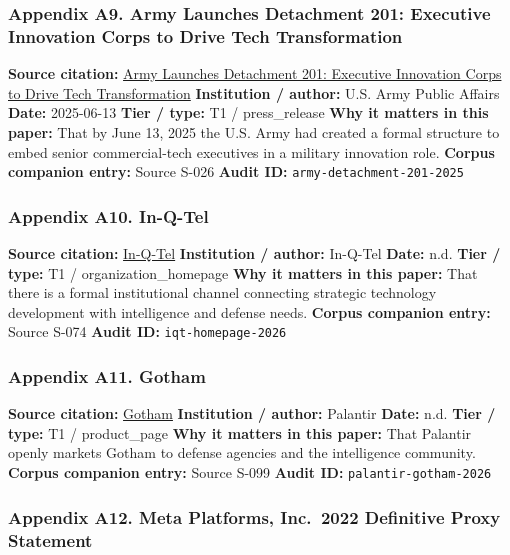 \documentclass[
  american,
  11pt,
  letterpaper,
]{article}
\begin{document}
\subsubsection{Appendix A9. Army Launches Detachment 201: Executive
Innovation Corps to Drive Tech
Transformation}\label{ch-07-appendix-a9-army-launches-detachment-201-executive-innovation-corps-to-drive-tech-transformation}

\textbf{Source citation:}
\href{https://www.army.mil/article/286317/army_launches_detachment_201_executive_innovation_corps_to_drive_tech_transformation}{Army
Launches Detachment 201: Executive Innovation Corps to Drive Tech
Transformation} \textbf{Institution / author:} U.S. Army Public Affairs
\textbf{Date:} 2025-06-13 \textbf{Tier / type:} T1 / press\_release
\textbf{Why it matters in this paper:} That by June 13, 2025 the U.S.
Army had created a formal structure to embed senior commercial-tech
executives in a military innovation role. \textbf{Corpus companion
entry:} Source S-026 \textbf{Audit ID:}
\texttt{army-detachment-201-2025}

\subsubsection{Appendix A10.
In-Q-Tel}\label{ch-07-appendix-a10-in-q-tel}

\textbf{Source citation:} \href{https://www.iqt.org/}{In-Q-Tel}
\textbf{Institution / author:} In-Q-Tel \textbf{Date:} n.d. \textbf{Tier
/ type:} T1 / organization\_homepage \textbf{Why it matters in this
paper:} That there is a formal institutional channel connecting
strategic technology development with intelligence and defense needs.
\textbf{Corpus companion entry:} Source S-074 \textbf{Audit ID:}
\texttt{iqt-homepage-2026}

\subsubsection{Appendix A11. Gotham}\label{ch-07-appendix-a11-gotham}

\textbf{Source citation:}
\href{https://www.palantir.com/platforms/gotham/}{Gotham}
\textbf{Institution / author:} Palantir \textbf{Date:} n.d. \textbf{Tier
/ type:} T1 / product\_page \textbf{Why it matters in this paper:} That
Palantir openly markets Gotham to defense agencies and the intelligence
community. \textbf{Corpus companion entry:} Source S-099 \textbf{Audit
ID:} \texttt{palantir-gotham-2026}

\subsubsection{Appendix A12. Meta Platforms, Inc.~2022 Definitive Proxy
Statement}\label{ch-07-appendix-a12-meta-platforms-inc-2022-definitive-proxy-statement}
\end{document}
